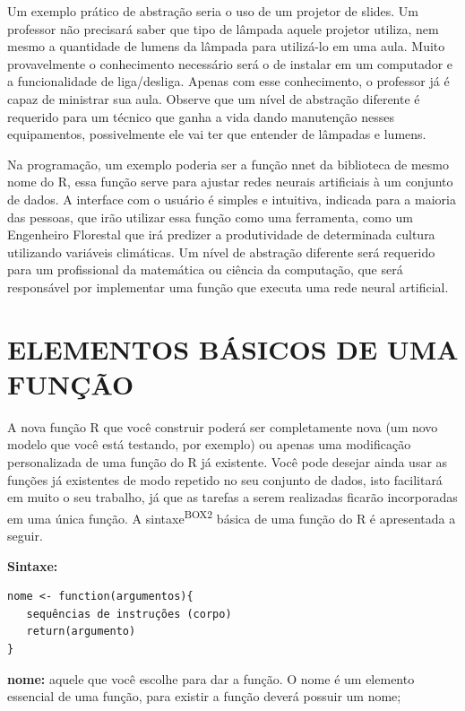 \documentclass[
  11pt,
  a5paper,
  openany]{book}
\begin{document}
Um exemplo prático de abstração seria o uso de um projetor de slides. Um professor não precisará saber que tipo de lâmpada aquele projetor utiliza, nem mesmo a quantidade de lumens da lâmpada para utilizá-lo em uma aula. Muito provavelmente o conhecimento necessário será o de instalar em um computador e a funcionalidade de liga/desliga. Apenas com esse conhecimento, o professor já é capaz de ministrar sua aula. Observe que um nível de abstração diferente é requerido para um técnico que ganha a vida dando manutenção nesses equipamentos, possivelmente ele vai ter que entender de lâmpadas e lumens.

Na programação, um exemplo poderia ser a função nnet da biblioteca de mesmo nome do R, essa função serve para ajustar redes neurais artificiais à um conjunto de dados. A interface com o usuário é simples e intuitiva, indicada para a maioria das pessoas, que irão utilizar essa função como uma ferramenta, como um Engenheiro Florestal que irá predizer a produtividade de determinada cultura utilizando variáveis climáticas. Um nível de abstração diferente será requerido para um profissional da matemática ou ciência da computação, que será responsável por implementar uma função que executa uma rede neural artificial.

\hypertarget{elementos-buxe1sicos-de-uma-funuxe7uxe3o}{%
\section{ELEMENTOS BÁSICOS DE UMA FUNÇÃO}\label{elementos-buxe1sicos-de-uma-funuxe7uxe3o}}

A nova função R que você construir poderá ser completamente nova (um novo modelo que você está testando, por exemplo) ou apenas uma modificação personalizada de uma função do R já existente. Você pode desejar ainda usar as funções já existentes de modo repetido no seu conjunto de dados, isto facilitará em muito o seu trabalho, já que as tarefas a serem realizadas ficarão incorporadas em uma única função.
A sintaxe\textsuperscript{BOX2} básica de uma função do R é apresentada a seguir.

\textbf{Sintaxe:}

\begin{verbatim}
nome <- function(argumentos){
   sequências de instruções (corpo)
   return(argumento)
}
\end{verbatim}

\textbf{nome:} aquele que você escolhe para dar a função. O nome é um elemento essencial de uma função, para existir a função deverá possuir um nome;
\end{document}
